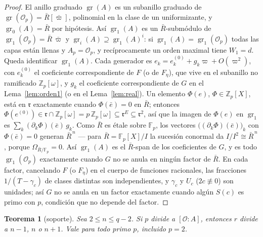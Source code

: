 \documentclass[11pt,a4paper]{article}
\newtheorem{theorem}{Teorema}
\theoremstyle{definition}
\newcommand{\ZZ}{\mathbb{Z}}
\newcommand{\FF}{\mathbb{F}}
\newcommand{\cO}{\mathcal{O}}
\newcommand{\rad}{\mathfrak{r}}
\newcommand{\gr}{\operatorname{gr}}
\begin{document}
\begin{proof}
El anillo graduado $\gr(A)$ es un subanillo graduado de $\gr(\cO_p)=\bar R[\bar\varpi]$, polinomial
en la clase de un uniformizante, y $\gr_0(A)=\bar R$ por hip\'otesis. As\'i $\gr_1(A)$ es un
$\bar R$-subm\'odulo de $\gr_1(\cO_p)=\bar R\,\bar\varpi$ y $\gr_i(A)\supseteq\gr_1(A)^i$: si
$\gr_1(A)=\gr_1(\cO_p)$ todas las capas est\'an llenas y $A_p=\cO_p$, y rec\'iprocamente un orden
maximal tiene $W_1=d$. Queda identificar $\gr_1(A)$. Cada generador es
$e_k=e_k^{(0)}+g_k\varpi+O(\varpi^2)$, con $e_k^{(0)}$ el coeficiente correspondiente de $F$ (o de
$F_\eta$), que vive en el subanillo no ramificado $\ZZ_p[\omega]$, y $g_k$ el coeficiente
correspondiente de $G$ en el Lema~\ref{lem:orden1} (o en el Lema~\ref{lem:real}). Un elemento
$\Phi(e)$, $\Phi\in\ZZ_p[X]$, est\'a en $\rad$ exactamente cuando $\Phi(\bar e)=0$ en $\bar R$;
entonces $\Phi(e^{(0)})\in\rad\cap\ZZ_p[\omega]=p\,\ZZ_p[\omega]\subseteq\rad^E\subseteq\rad^2$, as\'i
que la imagen de $\Phi(e)$ en $\gr_1$ es $\sum_k(\partial_k\Phi)(\bar e)\,g_k$. Como $\bar R$ es
\'etale sobre $\FF_p$, los vectores $\bigl((\partial_k\Phi)(\bar e)\bigr)_k$ con $\Phi(\bar e)=0$
generan $\bar R^{\,n}$ --- para $\bar R=\FF_p[X]/I$ la sucesi\'on conormal da
$I/I^2\cong\bar R^{\,n}$, porque $\Omega_{\bar R/\FF_p}=0$. As\'i $\gr_1(A)$ es el $\bar R$-span de
los coeficientes de $G$, y es todo $\gr_1(\cO_p)$ exactamente cuando $G$ no se anula en ning\'un
factor de $\bar R$. En cada factor, cancelando $F$ (o $F_\eta$) en el cuerpo de funciones racionales,
las fracciones $1/(T-\gamma_c)$ de clases distintas son independientes, y $\gamma_c$ y $U_c$
($2c\not\equiv0$) son unidades; as\'i $G$ no se anula en un factor exactamente cuando alg\'un $S(c)$ es
primo con $p$, condici\'on que no depende del factor.
\end{proof}

\begin{theorem}[soporte]\label{thm:sop}
Sea $2\le n\le q-2$. Si $p$ divide a $[\cO:A]$, entonces $r$ divide a $n-1$, $n$ o $n+1$. Vale para
todo primo $p$, incluido $p=2$.
\end{theorem}
\end{document}
